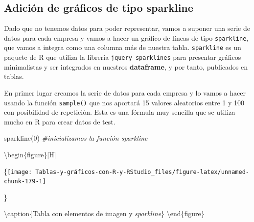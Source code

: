 \documentclass[
]{book}
\newenvironment{Shaded}{\begin{snugshade}}{\end{snugshade}}
\newcommand{\CommentTok}[1]{\textcolor[rgb]{0.56,0.35,0.01}{\textit{#1}}}
\newcommand{\DecValTok}[1]{\textcolor[rgb]{0.00,0.00,0.81}{#1}}
\newcommand{\FunctionTok}[1]{\textcolor[rgb]{0.00,0.00,0.00}{#1}}
\newcommand{\NormalTok}[1]{#1}
\begin{document}
\hypertarget{adiciuxf3n-de-gruxe1ficos-de-tipo-sparkline}{%
\subsection{Adición de gráficos de tipo sparkline}\label{adiciuxf3n-de-gruxe1ficos-de-tipo-sparkline}}

Dado que no tenemos datos para poder representar, vamos a suponer una serie de datos para cada empresa y vamos a hacer un gráfico de líneas de tipo \texttt{sparkline}, que vamos a integra como una columna más de nuestra tabla. \texttt{sparkline} es un paquete de R que utiliza la librería \texttt{jquery\ sparklines} para presentar gráficos minimalistas y ser integrados en nuestros \textbf{dataframe}, y por tanto, publicados en tablas.

En primer lugar creamos la serie de datos para cada empresa y lo vamos a hacer usando la función \texttt{sample()} que nos aportará 15 valores aleatorios entre 1 y 100 con posibilidad de repetición. Esta es una fórmula muy sencilla que se utiliza mucho en R para crear datos de test.

\begin{Shaded}
\begin{Highlighting}[]
\FunctionTok{sparkline}\NormalTok{(}\DecValTok{0}\NormalTok{)  }\CommentTok{\#inicializamos la función sparkline}
\end{Highlighting}
\end{Shaded}

\textbackslash begin\{figure\}{[}H{]}

\{\centering \texttt{[image: Tablas-y-gráficos-con-R-y-RStudio\_files/figure-latex/unnamed-chunk-179-1]}

\}

\textbackslash caption\{Tabla con elementos de imagen y \emph{sparkline}\}\label{fig:unnamed-chunk-179}
\textbackslash end\{figure\}
\end{document}
